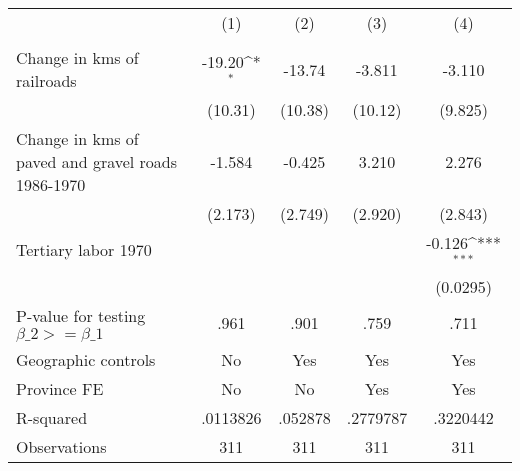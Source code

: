 {
\def\sym#1{\ifmmode^{#1}\else\(^{#1}\)\fi}
\begin{tabular}{l*{4}{c}}
\hline\hline
                &\multicolumn{1}{c}{(1)}&\multicolumn{1}{c}{(2)}&\multicolumn{1}{c}{(3)}&\multicolumn{1}{c}{(4)}\\
                &\multicolumn{1}{c}{}&\multicolumn{1}{c}{}&\multicolumn{1}{c}{}&\multicolumn{1}{c}{}\\
\hline
Change in kms of railroads&   -19.20\sym{*}  &   -13.74         &   -3.811         &   -3.110         \\
                &  (10.31)         &  (10.38)         &  (10.12)         &  (9.825)         \\
[1em]
Change in kms of paved and gravel roads 1986-1970&   -1.584         &   -0.425         &    3.210         &    2.276         \\
                &  (2.173)         &  (2.749)         &  (2.920)         &  (2.843)         \\
[1em]
Tertiary labor 1970&                  &                  &                  &   -0.126\sym{***}\\
                &                  &                  &                  & (0.0295)         \\
\hline
P-value for testing $\beta\_{2} >= \beta\_{1}$&     .961         &     .901         &     .759         &     .711         \\
Geographic controls&       No         &      Yes         &      Yes         &      Yes         \\
Province FE     &       No         &       No         &      Yes         &      Yes         \\
R-squared       & .0113826         &  .052878         & .2779787         & .3220442         \\
Observations    &      311         &      311         &      311         &      311         \\
\hline\hline
\end{tabular}
}
